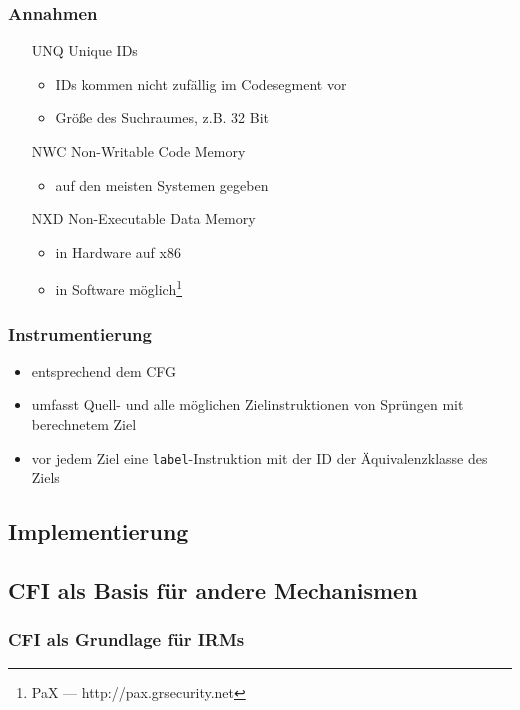 \documentclass[serif,slidestop,compress,red]{beamer}
\begin{document}
\begin{frame}
  \frametitle{Annahmen}
  \begin{itemize}
    \item[UNQ] Unique IDs
    \begin{itemize}
      \item IDs kommen nicht zufällig im Codesegment vor
      \item Größe des Suchraumes, z.B. 32 Bit
    \end{itemize}
    \item[NWC] Non-Writable Code Memory
    \begin{itemize}
      \item auf den meisten Systemen gegeben
    \end{itemize}
    \item[NXD] Non-Executable Data Memory
    \begin{itemize}
      \item in Hardware auf x86
      \item in Software möglich\footnote{PaX — http://pax.grsecurity.net}
    \end{itemize}
  \end{itemize}
\end{frame}

\begin{frame}
  \frametitle{Instrumentierung}
  \begin{itemize}
    \item entsprechend dem CFG
    \item umfasst Quell- und alle möglichen Zielinstruktionen von Sprüngen mit berechnetem Ziel
    \item vor jedem Ziel eine \texttt{label}-Instruktion mit der ID der Äquivalenzklasse des Ziels
  \end{itemize}
\end{frame}

\subsection{Implementierung}

\subsection{CFI als Basis für andere Mechanismen}

\begin{frame}
  \frametitle{CFI als Grundlage für IRMs}
\end{frame}
\end{document}
